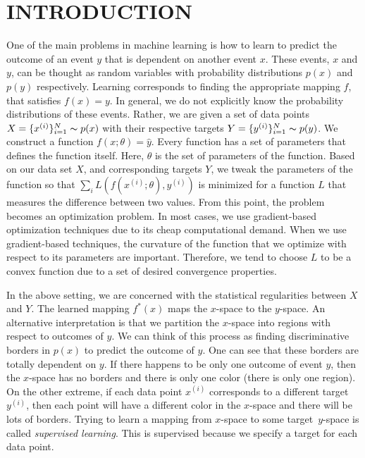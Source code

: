 \documentclass[a4paper,onesided,12pt]{report}
\begin{document}
\begin{abbreviations}
\end{abbreviations}


\chapter{INTRODUCTION}
\label{chapter:intro}
One of the main problems in machine learning is how to learn to predict the outcome of an event $y$ that is dependent on another event $x$. These events, $x$ and $y$, can be thought as random variables with probability distributions $p(x)$ and $p(y)$ respectively. Learning corresponds to finding the appropriate mapping $f$, that satisfies $f(x) = y$. In general, we do not explicitly know the probability distributions of these events. Rather, we are given a set of data points $X=\{x^{(i)}\}_{i=1}^{N}\thicksim p(x)$ with their respective targets $Y=\{y^{(i)}\}_{i=1}^{N}\thicksim p(y)$. We construct a function $f(x; \theta)=\hat{y}$. Every function has a set of parameters that defines the function itself. Here, $\theta$ is the set of parameters of the function. Based on our data set $X$, and corresponding targets $Y$, we tweak the parameters of the function so that $\sum_i L(f(x^{(i)}; \theta), y^{(i)})$ is minimized for a function $L$ that measures the difference between two values. From this point, the problem becomes an optimization problem. In most cases, we use gradient-based optimization techniques due to its cheap computational demand. When we use gradient-based techniques, the curvature of the function that we optimize with respect to its parameters are important. Therefore, we tend to choose $L$ to be a convex function due to a set of desired convergence properties.

In the above setting, we are concerned with the statistical regularities between $X$ and $Y$. The learned mapping $f^{*}(x)$ maps the $x$-space to the $y$-space. An alternative interpretation is that we partition the $x$-space into regions with respect to outcomes of $y$. We can think of this process as finding discriminative borders in $p(x)$ to predict the outcome of $y$. One can see that these borders are totally dependent on $y$. If there happens to be only one outcome of event $y$, then the $x$-space has no borders and there is only one color (there is only one region). On the other extreme, if each data point $x^{(i)}$ corresponds to a different target $y^{(i)}$, then each point will have a different color in the $x$-space and there will be lots of borders. Trying to learn a mapping from $x$-space to some target~$y$-space is called \emph{supervised learning}. This is supervised because we specify a target for each data point.
\end{document}

